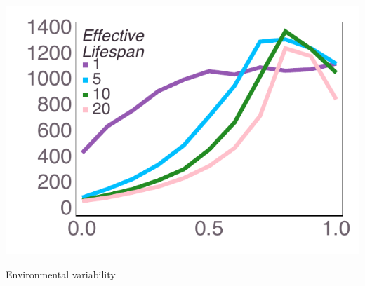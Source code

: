 \documentclass[varwidth=true,crop=false]{standalone}
\newcommand{\meanvar}[1]{\langle #1 \rangle}
\newcommand{\meansoc}{\meanvar{\pi_\mathrm{S}}}
\newcommand{\meanasoc}{\meanvar{\pi_\mathrm{A}}}
\begin{document}
	\begin{minipage}{3.75in}%
		  \includegraphics[width=\textwidth]{Figures/step_over_u_lowpayoff=0.8_nbehaviors=10.pdf}
		  \\[-2.75em]
	  \begin{center}
          {\hspace{3.25em} \huge Environmental variability}
      \end{center}
	\end{minipage}  
\end{document}
